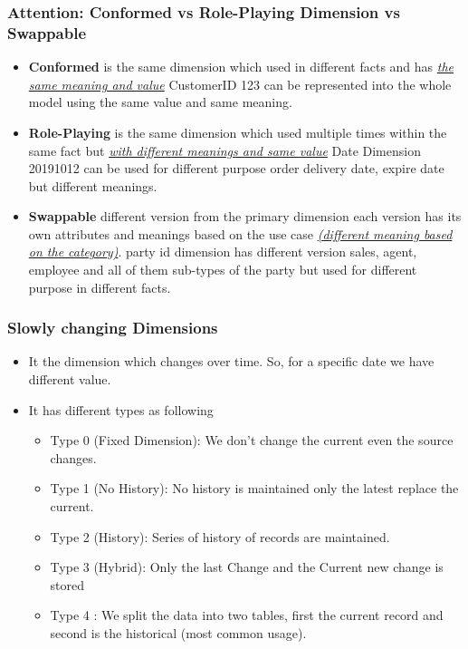 \begin{frame}
\frametitle{Attention: Conformed vs Role-Playing Dimension vs Swappable}
	\begin{itemize}[<+->]
		\item \textbf{Conformed} is the same dimension which used in different facts and has \textit{\underline{the same meaning and value}} \forexample CustomerID 123 can be represented into the whole model using the same value and same meaning.
		\item \textbf{Role-Playing} is the same dimension which used multiple times within the same fact but \textit{\underline{with different meanings and same value}} \forexample Date Dimension 20191012 can be used for different purpose order delivery date, expire date but different meanings.
		\item \textbf{Swappable} different version from the primary dimension each version has its own attributes and meanings based on the use case \textit{\underline{(different meaning based on the category)}}. \forexample party id dimension has different version sales, agent, employee and all of them sub-types of the party but used for different purpose in different facts.
	\end{itemize}

\end{frame}
\begin{frame}
    \frametitle{Slowly changing Dimensions}
    \begin{itemize}[<+->]
		\item It the dimension which changes over time. So, for a specific date we have different value.
		\item It has different types as following
		    \begin{itemize}[<+->]
        \item Type 0 (Fixed Dimension): We don't change the current even the source changes. 
        \item Type 1 (No History): No history is maintained only the latest replace the current.
        \item Type 2 (History): Series of history of records are maintained.
        \item Type 3 (Hybrid): Only the last Change and the Current new change is stored
        \item Type 4 : We split the data into two tables, first the current record and second is the historical (most common usage).
    \end{itemize}   


    \end{itemize}
\end{frame}
